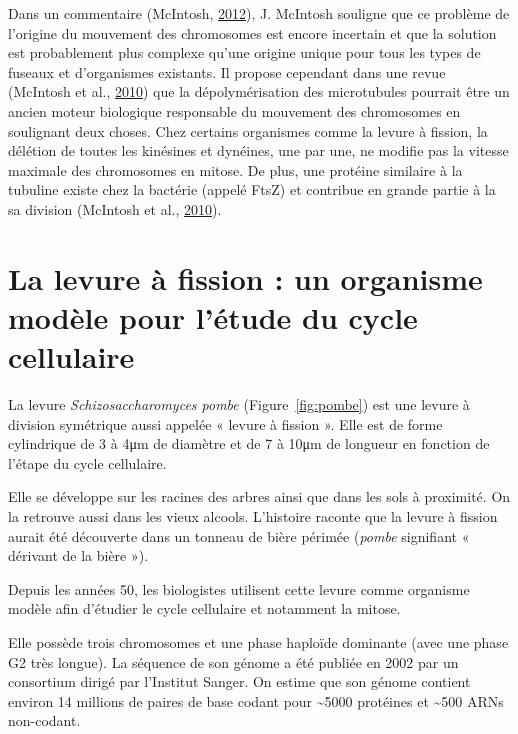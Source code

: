 \documentclass[12pt,a4paper,twoside,openright]{book}
\begin{document}
Dans un commentaire (McIntosh, \hyperref[ref-McIntosh2012]{2012}), J.
McIntosh souligne que ce problème de l'origine du mouvement des
chromosomes est encore incertain et que la solution est probablement
plus complexe qu'une origine unique pour tous les types de fuseaux et
d'organismes existants. Il propose cependant dans une revue (McIntosh et
al., \hyperref[ref-McIntosh2010]{2010}) que la dépolymérisation des
microtubules pourrait être un ancien moteur biologique responsable du
mouvement des chromosomes en soulignant deux choses. Chez certains
organismes comme la levure à fission, la délétion de toutes les
kinésines et dynéines, une par une, ne modifie pas la vitesse maximale
des chromosomes en mitose. De plus, une protéine similaire à la tubuline
existe chez la bactérie (appelé FtsZ) et contribue en grande partie à la
sa division (McIntosh et al., \hyperref[ref-McIntosh2010]{2010}).

\section{La levure à fission : un organisme modèle pour l'étude du cycle
cellulaire}\label{la-levure-uxe0-fission-un-organisme-moduxe8le-pour-luxe9tude-du-cycle-cellulaire}

La levure \emph{Schizosaccharomyces pombe} (Figure~\ref{fig:pombe}) est
une levure à division symétrique aussi appelée « levure à fission ».
Elle est de forme cylindrique de 3 à 4μm de diamètre et de 7 à 10μm de
longueur en fonction de l'étape du cycle cellulaire.

Elle se développe sur les racines des arbres ainsi que dans les sols à
proximité. On la retrouve aussi dans les vieux alcools. L'histoire
raconte que la levure à fission aurait été découverte dans un tonneau de
bière périmée (\emph{pombe} signifiant « dérivant de la bière »).

Depuis les années 50, les biologistes utilisent cette levure comme
organisme modèle afin d'étudier le cycle cellulaire et notamment la
mitose.

Elle possède trois chromosomes et une phase haploïde dominante (avec une
phase G2 très longue). La séquence de son génome a été publiée en 2002
par un consortium dirigé par l'Institut Sanger. On estime que son génome
contient environ 14 millions de paires de base codant pour
\textasciitilde{}5000 protéines et \textasciitilde{}500 ARNs non-codant.
\end{document}
